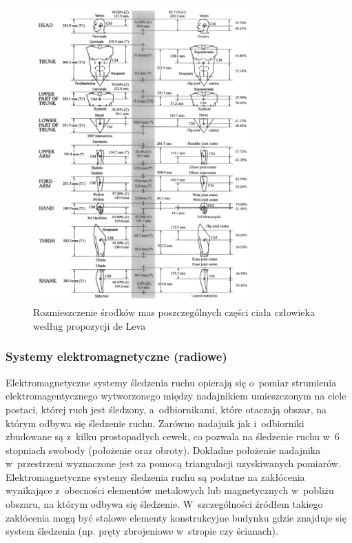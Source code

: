 \begin{savenotes}
	\begin{figure}[!htp]
		\centering	
		\includegraphics[width=0.75\textwidth]{images/centerOfMass.png}
		\caption[Rozmieszczenie środków mas poszczególnych części ciała człowieka według propozycji de Leva]{Rozmieszczenie środków mas poszczególnych części ciała człowieka według propozycji de Leva\cite{DeLeva1996}}	
		\label{fig:centerOfMass}	
	\end{figure}
\end{savenotes}
									
\subsubsection*{Systemy elektromagnetyczne (radiowe)}
Elektromagnetyczne systemy śledzenia ruchu opierają się o~pomiar strumienia elektromagentycznego wytworzonego między nadajnikiem umieszczonym na ciele postaci, której ruch jest śledzony, a~odbiornikami, które otaczają obszar, na którym odbywa się śledzenie ruchu. Zarówno nadajnik jak i~odbiorniki zbudowane są z~kilku prostopadłych cewek, co pozwala na śledzenie ruchu w~6 stopniach swobody (położenie oraz obroty). Dokładne położenie nadajnika w~przestrzeni wyznaczone jest za pomocą triangulacji uzyskiwanych pomiarów. Elektromagnetyczne systemy śledzenia ruchu są podatne na zakłócenia wynikające z~obecności elementów metalowych lub magnetycznych w~pobliżu obszaru, na którym odbywa się śledzenie. W~szczególności źródłem  takiego zakłócenia mogą być stalowe elementy konstrukcyjne budynku gdzie znajduje się system śledzenia (np. pręty zbrojeniowe w~stropie czy ścianach). 
									
